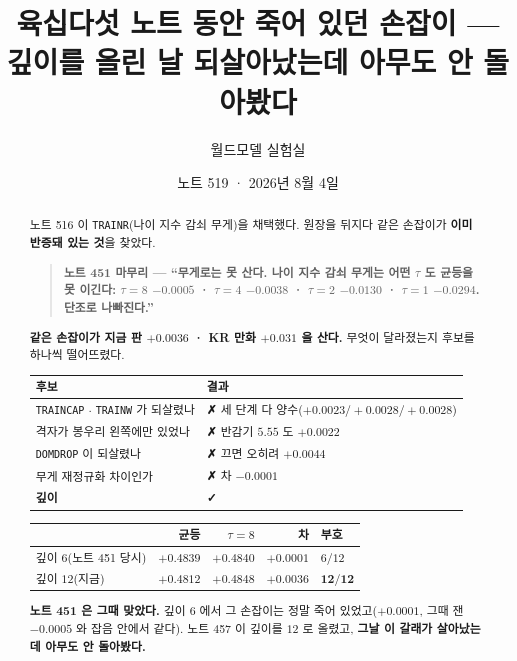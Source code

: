 \documentclass[11pt]{article}
\begin{document}
\title{육십다섯 노트 동안 죽어 있던 손잡이 --- 깊이를 올린 날 되살아났는데 아무도 안 돌아봤다}
\author{월드모델 실험실}
\date{노트 519 · 2026년 8월 4일}
\maketitle

\begin{abstract}
노트 516 이 \texttt{TRAINR}(나이 지수 감쇠 무게)을 채택했다. 원장을 뒤지다
같은 손잡이가 \textbf{이미 반증돼 있는 것}을 찾았다.

\begin{quote}
\textbf{노트 451 마무리 --- ``무게로는 못 산다. 나이 지수 감쇠 무게는 어떤
$\tau$ 도 균등을 못 이긴다: $\tau{=}8$ $-0.0005$ · $\tau{=}4$ $-0.0038$ ·
$\tau{=}2$ $-0.0130$ · $\tau{=}1$ $-0.0294$. 단조로 나빠진다.''}
\end{quote}

\textbf{같은 손잡이가 지금 판 $+0.0036$ · KR 만화 $+0.031$ 을 산다.}
무엇이 달라졌는지 후보를 하나씩 떨어뜨렸다.

\begin{center}
\begin{tabular}{ll}
\hline
후보 & 결과 \\
\hline
\texttt{TRAINCAP} $\cdot$ \texttt{TRAINW} 가 되살렸나 & \textbf{✗} 세 단계 다 양수($+0.0023 / +0.0028 / +0.0028$) \\
격자가 봉우리 왼쪽에만 있었나 & \textbf{✗} 반감기 $5.55$ 도 $+0.0022$ \\
\texttt{DOMDROP} 이 되살렸나 & \textbf{✗} 끄면 오히려 $+0.0044$ \\
무게 재정규화 차이인가 & \textbf{✗} 차 $-0.0001$ \\
\hline
\textbf{깊이} & \textbf{✓} \\
\hline
\end{tabular}
\end{center}

\begin{center}
\begin{tabular}{lrrrl}
\hline
& 균등 & $\tau{=}8$ & 차 & 부호 \\
\hline
깊이 $6$(노트 451 당시) & $+0.4839$ & $+0.4840$ & $+0.0001$ & $6/12$ \\
깊이 $12$(지금) & $+0.4812$ & $+0.4848$ & $\mathbf{+0.0036}$ & $\mathbf{12/12}$ \\
\hline
\end{tabular}
\end{center}

\textbf{노트 451 은 그때 맞았다.} 깊이 $6$ 에서 그 손잡이는 정말 죽어
있었고($+0.0001$, 그때 잰 $-0.0005$ 와 잡음 안에서 같다). 노트 457 이
깊이를 $12$ 로 올렸고, \textbf{그날 이 갈래가 살아났는데 아무도 안
돌아봤다.}
\end{abstract}
\end{document}
